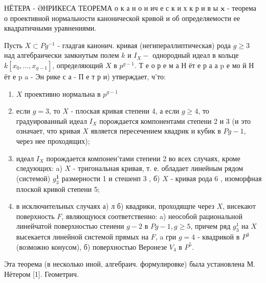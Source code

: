 \documentclass[10pt]{article}
\begin{document}
НЁТЕРА - ӘНРИКЕСА ТЕОРЕМА о к а н о н ич е с к и х к р и в ы $\mathbf{x}$ - теорема о проективной нормальности канонической кривой и об определяемости ее квадратичными уравнениями.



Пусть $X \subset P g^{-1}$ - гладгая канонич. кривая (негиперәллиптическая) рода $g \geqslant 3$ над алгебраически замкнутым полем $k$ и $I_{X}-$ однородный идеал в кольце $k\left[x_{0}, \ldots, x_{g-1}\right]$, определяющий $X$ в $p^{g-1}$. Т е о р е м а Н ёт е р а $а$ p е мо й Н ёт е p a - Эн рике с а - П е т р и) утверждает, ч'то:



\begin{enumerate}

  \item $X$ проективно нормальна в $p^{g-1}$



  \item если $g=3$, то $X$ - плоская кривая степени 4, а если $g \geqslant 4$, то градуированный идеал $I_{X}$ порождается компонентами степени 2 и 3 (и это означает, что кривая $X$ является пересечением квадрик и кубик в $P g-1$, через нее проходящих);



  \item идеал $I_{X}$ порождается компонен'тами степени 2 во всех случаях, кроме следующих: a) $X$ - тригональная кривая, т. е. обладает линейным рядом (системой) $g_{3}^{\mathbf{1}}$ размерности 1 и стешенп 3 , б) $X$ - кривая рода 6 , изоморфная плоской кривой степени 5;



  \item в исключительных случаях а) л б) квадрики, проходящпе через $X$, висекают поверхность $F$, являющуюся соответственно: a) неособой рациональной линейчатой поверхностью стенени $g-2$ в $P g-1, g \geqslant 5$, причем ряд $g_{3}^{1}$ на $X$ высекается линейной системой прямых на $F$, a гри $g=4$ - квадрикой в $P^{3}$ (возможно конусом), б) поверхностью Веронезе $V_{4}$ в $P^{5}$.



\end{enumerate}



Эта теорема (в несколько иной, алгебраич. формулировке) была установлена М. Нётером [1]. Геометрич.
\end{document}
